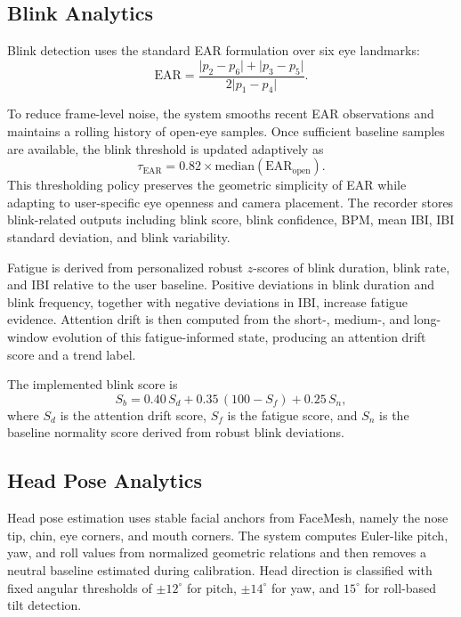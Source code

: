 \documentclass[conference]{IEEEtran}
\begin{document}
\subsection{Blink Analytics}
Blink detection uses the standard EAR formulation over six eye landmarks:
\begin{equation}
\mathrm{EAR}=\frac{\lvert p_2-p_6\rvert+\lvert p_3-p_5\rvert}{2\lvert p_1-p_4\rvert}.
\end{equation}

To reduce frame-level noise, the system smooths recent EAR observations and maintains a rolling history of open-eye samples. Once sufficient baseline samples are available, the blink threshold is updated adaptively as
\begin{equation}
\tau_{\mathrm{EAR}}=0.82\times \mathrm{median}(\mathrm{EAR}_{\mathrm{open}}).
\end{equation}
This thresholding policy preserves the geometric simplicity of EAR while adapting to user-specific eye openness and camera placement. The recorder stores blink-related outputs including blink score, blink confidence, BPM, mean IBI, IBI standard deviation, and blink variability.

Fatigue is derived from personalized robust $z$-scores of blink duration, blink rate, and IBI relative to the user baseline. Positive deviations in blink duration and blink frequency, together with negative deviations in IBI, increase fatigue evidence. Attention drift is then computed from the short-, medium-, and long-window evolution of this fatigue-informed state, producing an attention drift score and a trend label.

The implemented blink score is
\begin{equation}
S_b = 0.40\,S_d + 0.35\,(100-S_f) + 0.25\,S_n,
\end{equation}
where $S_d$ is the attention drift score, $S_f$ is the fatigue score, and $S_n$ is the baseline normality score derived from robust blink deviations.

\subsection{Head Pose Analytics}
Head pose estimation uses stable facial anchors from FaceMesh, namely the nose tip, chin, eye corners, and mouth corners. The system computes Euler-like pitch, yaw, and roll values from normalized geometric relations and then removes a neutral baseline estimated during calibration. Head direction is classified with fixed angular thresholds of $\pm12^\circ$ for pitch, $\pm14^\circ$ for yaw, and $15^\circ$ for roll-based tilt detection.
\end{document}
